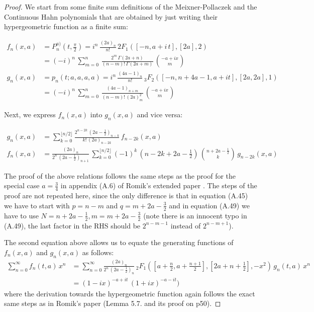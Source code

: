 \documentclass[a4paper,11pt,twoside]{amsart}
\newcommand{\verifiedeq}{=}
\newcommand{\defeq}{=}
\newcommand{\verifiedeq}{\stackrel{\checkmark}{=}}
\newcommand{\defeq}{\stackrel{\scriptscriptstyle \textnormal{def}}{=}}
\begin{document}
\begin{proof}
We start from some finite sum definitions of the Meixner-Pollaczek and the Continuous Hahn polynomials that are obtained by just writing their hypergeometric function as a finite sum:

\begin{align}
 f_n(x,a) &\defeq P_n^{a)}\left(t,\frac{\pi}{2}\right) \defeq i^n\,\frac{(2a)_n}{n!}\,{}2F_1\left([-n, a+i\,t],[2a],2\right) \\
 &= (-i)^n\,\sum_{m=0}^n\,\frac{2^m\,\Gamma(2a+n)}{(n-m)!\,\Gamma(2a+m)}\,\binom{-a+ix}{m} \\
 g_n(x,a) &\defeq p_n(t;a,a,a,a) \defeq i^n\,\frac{(4a-1)_n}{n!}\, {}_3F_2([-n, n+ 4a-1,a+it], [2a, 2a], 1) \\
 &\defeq (-i)^n\,\sum_{m=0}^n\,\frac{(4a-1)_{n+m}}{(n-m)!\,(2a)_m^2}\,\binom{-a+ix}{m}
\end{align}

Next, we express $f_n(x,a)$ into $g_n(x,a)$ and vice versa:

\begin{align}
g_n(x,a) &\verifiedeq \sum_{k=0}^{\lfloor n/2\rfloor} \frac{2^{n-2k}\,\left(2a-\frac12\right)_{n-k}}{k!\,(2a)_{n-2k}}\,f_{n-2k}(x,a) \\
f_n(x,a) &\verifiedeq \frac{(2a)_n}{2^n\,\left(2a-\frac12\right)_{n+1}}\,\sum_{k=0}^{\lfloor n/2\rfloor} (-1)^k\,\left(n-2k+2a-\frac12\right)\,\binom{n+2a-\frac12}{k}\,g_{n-2k}(x,a)
\end{align}

The proof of the above relations follows the same steps as the proof for the special case $a=\frac34$ in appendix (A.6) of Romik's extended paper \cite{rom}. The steps of the proof are not repeated here, since the only difference is that in equation (A.45) we have to start with $p=n-m$ and $q=m+2a-\frac32$ and in equation (A.49) we have to use $N\verifiedeq n + 2a - \frac12, m\verifiedeq m +2a-\frac32$ (note there is an innocent typo in (A.49), the last factor in the RHS should be $2^{n-m-1}$ instead of $2^{n-m+1}$).

The second equation above allows us to equate the generating functions of $f_n(x,a)$ and $g_n(x,a)$ as follows:
\begin{align}
 \sum_{n=0}^\infty f_n(t,a)\,x^n &\verifiedeq \sum_{n=0}^\infty \frac{(2a)_n}{2^n\,\left(2a-\frac12\right)_n}\,{}_2F_1\left(\left[a+\frac{n}{2}, a+\frac{n+1}{2}\right],\left[2a+n+\frac12\right],-x^2\right) \,g_n(t,a)\,x^n \\
 &\verifiedeq (1-ix)^{-a+it}\,(1+ix)^{-a-it})
\end{align}
where the derivation towards the hypergeometric function again follows the exact same steps as in Romik's paper (Lemma 5.7. and its proof on p50). 


\end{proof}
\end{document}
